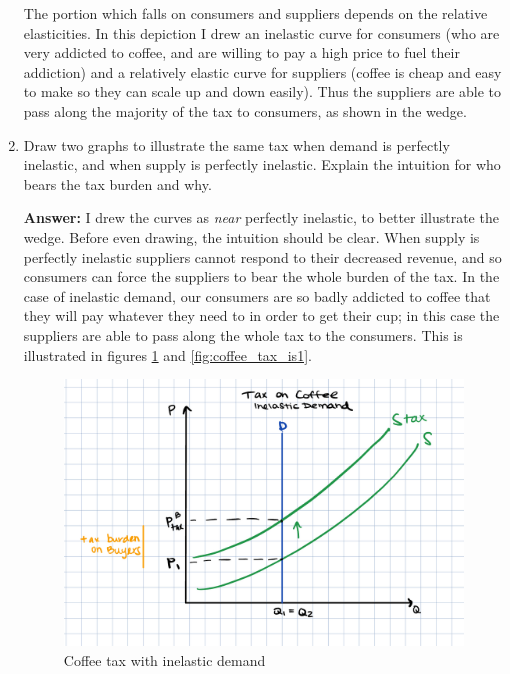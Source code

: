 \documentclass[12pt]{article}
\begin{document}
\begin{enumerate}
\vspace{2mm}

The portion which falls on consumers and suppliers depends on the relative elasticities. In this depiction I drew an inelastic curve for consumers (who are very addicted to coffee, and are willing to pay a high price to fuel their addiction) and a relatively elastic curve for suppliers (coffee is cheap and easy to make so they can scale up and down easily). Thus the suppliers are able to pass along the majority of the tax to consumers, as shown in the wedge.

\vspace{2mm}


\item Draw two graphs to illustrate the same tax when demand is perfectly inelastic, and when supply is perfectly inelastic. Explain the intuition for who bears the tax burden and why.

\textbf{Answer:}
I drew the curves as \textit{near} perfectly inelastic, to better illustrate the wedge. Before even drawing, the intuition should be clear. When supply is perfectly inelastic suppliers cannot respond to their decreased revenue, and so consumers can force the suppliers to bear the whole burden of the tax. In the case of inelastic demand, our consumers are so badly addicted to coffee that they will pay whatever they need to in order to get their cup; in this case the suppliers are able to pass along the whole tax to the consumers. This is illustrated in figures \ref{fig:coffee_tax_id} and \ref{fig:coffee_tax_is1}.

\begin{figure}
    \centering
    \includegraphics[width=.6\textwidth]{coffee_tax_id.png}
    \caption{Coffee tax with inelastic demand}
    \label{fig:coffee_tax_id}
\end{figure}


\end{enumerate}
\end{document}
